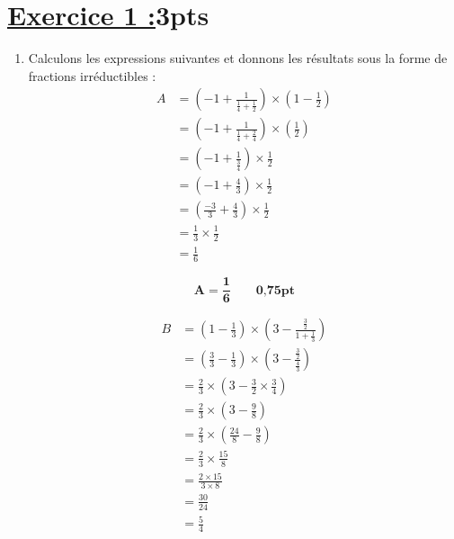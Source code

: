 \documentclass[12pt,a4paper]{article}
\begin{document}
\section*{\underline{Exercice 1 :}3pts}
\begin{enumerate}
\item Calculons les expressions suivantes et donnons les résultats sous la forme de fractions irréductibles :
\[
\begin{aligned}
    A &= \left( -1 + \frac{1}{\frac{1}{4} + \frac{1}{2}} \right) \times \left( 1 - \frac{1}{2} \right) \\[6pt]
    &= \left( -1 + \frac{1}{\frac{1}{4} + \frac{2}{4}} \right) \times \left( \frac{1}{2} \right) \\[6pt]
    &= \left( -1 + \frac{1}{\frac{3}{4}} \right) \times \frac{1}{2} \\[6pt]
    &= \left( -1 + \frac{4}{3} \right) \times \frac{1}{2} \\[6pt]
    &= \left( \frac{-3}{3} + \frac{4}{3} \right) \times \frac{1}{2} \\[6pt]
    &= \frac{1}{3} \times \frac{1}{2} \\[6pt]
    &= \frac{1}{6}
\end{aligned}
\]

\begin{tcolorbox}[colback=yellow!20, colframe=black, sharp corners]
    \[
    \mathbf{A = \frac{1}{6}}\quad\quad     \textbf{0,75pt}
    \]
\end{tcolorbox}

\[
\begin{aligned}
    B &= \left( 1 - \frac{1}{3} \right) \times \left( 3 - \frac{\frac{3}{2}}{1 + \frac{1}{3}} \right) \\[6pt]
    &= \left( \frac{3}{3} - \frac{1}{3} \right) \times \left( 3 - \frac{\frac{3}{2}}{\frac{4}{3}} \right) \\[6pt]
    &= \frac{2}{3} \times \left( 3 - \frac{3}{2} \times \frac{3}{4} \right) \\[6pt]
    &= \frac{2}{3} \times \left( 3 - \frac{9}{8} \right) \\[6pt]
    &= \frac{2}{3} \times \left( \frac{24}{8} - \frac{9}{8} \right) \\[6pt]
    &= \frac{2}{3} \times \frac{15}{8} \\[6pt]
    &= \frac{2 \times 15}{3 \times 8} \\[6pt]
    &= \frac{30}{24} \\[6pt]
    &= \frac{5}{4}
\end{aligned}
\]


\end{enumerate}
\end{document}
